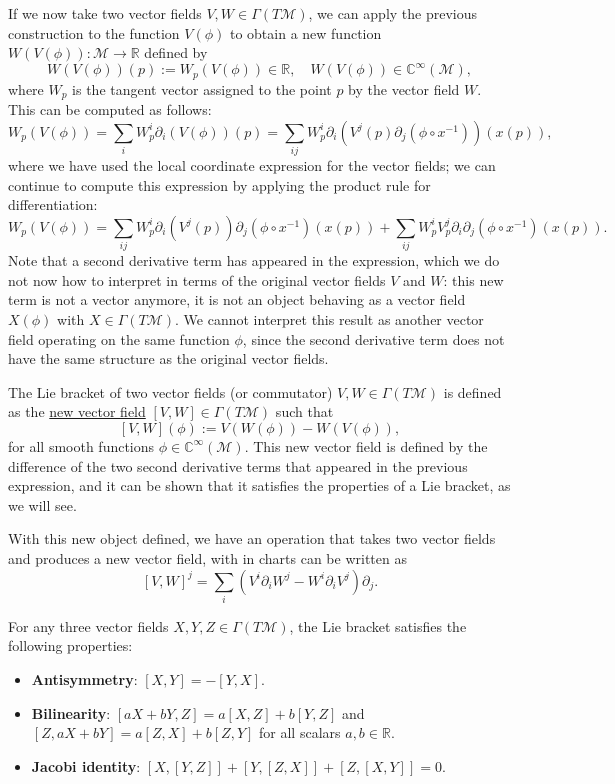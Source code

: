 If we now take two vector fields \(V, W \in \Gamma(T\mathcal{M})\), we can apply the previous construction to the function \(V(\phi)\) to obtain a new function \(W(V(\phi)) : \mathcal{M} \to \mathbb{R}\) defined by
\[
    W(V(\phi))(p) := W_p(V(\phi)) \in \mathbb{R}, \quad W(V(\phi)) \in \mathbb{C}^{\infty}(\mathcal{M}),
\]
where \(W_p\) is the tangent vector assigned to the point \(p\) by the vector field \(W\). This can be computed as follows:
\[
    W_p(V(\phi)) = \sum_{i} W_p^i \partial_i (V(\phi))(p) = \sum_{ij} W_p^i \partial_i (V^j(p) \partial_j (\phi \circ x^{-1}))(x(p)),
\]
where we have used the local coordinate expression for the vector fields; we can continue to compute this expression by applying the product rule for differentiation:
\[
    W_p(V(\phi)) = \sum_{ij} W_p^i \partial_i (V^j(p)) \partial_j (\phi \circ x^{-1})(x(p)) + \sum_{ij} W_p^i V_p^j \partial_i \partial_j (\phi \circ x^{-1})(x(p)).
\]
Note that a second derivative term has appeared in the expression, which we do not now how to interpret in terms of the original vector fields \(V\) and \(W\): this new term is not a vector anymore, it is not an object behaving as a vector field \(X(\phi)\) with \(X \in \Gamma(T\mathcal{M})\). We cannot interpret this result as another vector field operating on the same function \(\phi\), since the second derivative term does not have the same structure as the original vector fields.

\begin{definition}
    The Lie bracket of two vector fields (or commutator) \(V, W \in \Gamma(T\mathcal{M})\) is defined as the \uline{new vector field} \([V, W] \in \Gamma(T\mathcal{M})\) such that
    \[
        [V, W](\phi) := V(W(\phi)) - W(V(\phi)),
    \]
    for all smooth functions \(\phi \in \mathbb{C}^{\infty}(\mathcal{M})\). This new vector field is defined by the difference of the two second derivative terms that appeared in the previous expression, and it can be shown that it satisfies the properties of a Lie bracket, as we will see.
\end{definition}

With this new object defined, we have an operation that takes two vector fields and produces a new vector field, with in charts can be written as
\[
    [V, W]^j = \sum_{i} \left( V^i \partial_i W^j - W^i \partial_i V^j \right) \partial_j.
\]

\begin{proposition}
    For any three vector fields \(X, Y, Z \in \Gamma(T\mathcal{M})\), the Lie bracket satisfies the following properties:
    \begin{itemize}
        \item \textbf{Antisymmetry}: \([X, Y] = -[Y, X]\).
        \item \textbf{Bilinearity}: \([aX + bY, Z] = a[X, Z] + b[Y, Z]\) and \([Z, aX + bY] = a[Z, X] + b[Z, Y]\) for all scalars \(a, b \in \mathbb{R}\).
        \item \textbf{Jacobi identity}: \([X, [Y, Z]] + [Y, [Z, X]] + [Z, [X, Y]] = 0\).
    \end{itemize}
\end{proposition}

